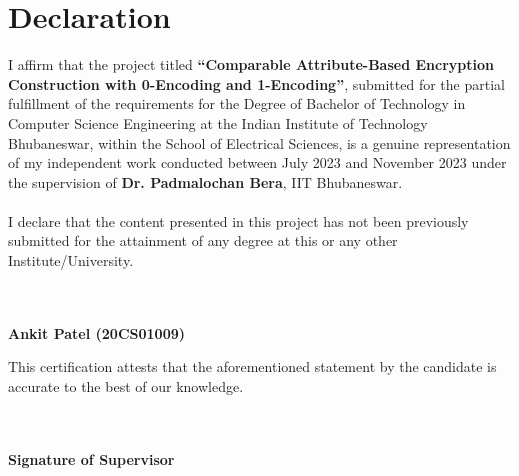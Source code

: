 \chapter*{Declaration}

I affirm that the project titled \textbf{“Comparable Attribute-Based
Encryption Construction with 0-Encoding
and 1-Encoding”}, submitted for the partial fulfillment of the requirements for the Degree of Bachelor of Technology in Computer Science Engineering at the Indian Institute of Technology Bhubaneswar, within the School of Electrical Sciences, is a genuine representation of my independent work conducted between July 2023 and November 2023 under the supervision of \textbf{Dr. Padmalochan Bera}, IIT Bhubaneswar.
\\
\\
I declare that the content presented in this project has not been previously submitted for the attainment of any degree at this or any other Institute/University.
\\
\\
\\
\begin{flushright}
    \textbf{Ankit Patel (20CS01009)}
\end{flushright}
This certification attests that the aforementioned statement by the candidate is accurate to the best of our knowledge.
\\
\\
\\
\begin{flushright}
    \textbf{Signature of Supervisor}
\end{flushright}
